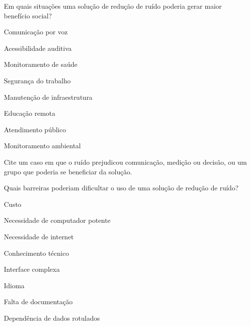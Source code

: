 \newpage


\begin{perguntaFormulario}{Em quais situações uma solução de redução de ruído poderia gerar maior benefício social?}
\begin{opcoesFormularioDuasColunas}
    \item Comunicação por voz
    \item Acessibilidade auditiva
    \item Monitoramento de saúde
    \item Segurança do trabalho
    \item Manutenção de infraestrutura
    \item Educação remota
    \item Atendimento público
    \item Monitoramento ambiental
\end{opcoesFormularioDuasColunas}
\end{perguntaFormulario}

\begin{perguntaFormulario}{Cite um caso em que o ruído prejudicou comunicação, medição ou decisão, ou um grupo que poderia se beneficiar da solução.}
\end{perguntaFormulario}

\newpage


\begin{perguntaFormulario}{Quais barreiras poderiam dificultar o uso de uma solução de redução de ruído?}
\begin{opcoesFormularioDuasColunas}
    \item Custo
    \item Necessidade de computador potente
    \item Necessidade de internet
    \item Conhecimento técnico
    \item Interface complexa
    \item Idioma
    \item Falta de documentação
    \item Dependência de dados rotulados
\end{opcoesFormularioDuasColunas}
\end{perguntaFormulario}

